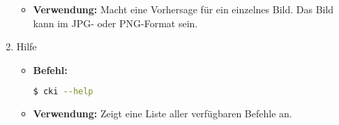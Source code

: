 \begin{enumerate}
\begin{itemize}
					\item \textbf{Verwendung:} Macht eine Vorhersage für ein einzelnes Bild. Das Bild kann im JPG- oder PNG-Format sein.
				\end{itemize}
	\item Hilfe
				\begin{itemize}
					\item \textbf{Befehl:}
								\begin{lstlisting}[language=bash]
$ cki --help
								\end{lstlisting}
					\item \textbf{Verwendung:} Zeigt eine Liste aller verfügbaren Befehle an.
				\end{itemize}
\end{enumerate}